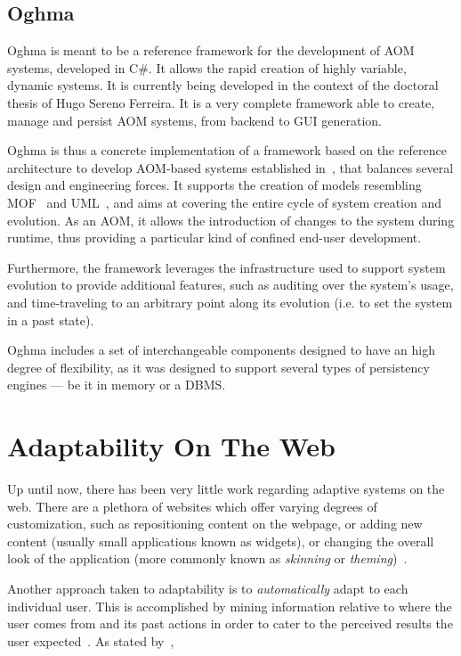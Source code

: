 \subsection{Oghma}\label{sec:oghma}

Oghma is meant to be a reference framework for the development of AOM systems, developed in C\#. It allows the rapid creation of highly variable, dynamic systems. It is currently being developed in the context of the doctoral thesis of Hugo Sereno Ferreira. It is a very complete framework able to create, manage and persist AOM systems, from backend to GUI generation.

Oghma is thus a concrete implementation of a framework based on the reference architecture to develop AOM-based systems established in~\cite{ferreira_phd_2010}, that balances several design and engineering forces. It supports the creation of models resembling MOF~\cite{mof} and UML~\cite{uml}, and aims at covering the entire cycle of system creation and evolution. As an AOM, it allows the introduction of changes to the system during runtime, thus providing a particular kind of confined end-user development.

Furthermore, the framework leverages the infrastructure used to support system evolution to provide additional features, such as auditing over the system’s usage, and time-traveling to an arbitrary point along its evolution (i.e. to set the system in a past state).

Oghma includes a set of interchangeable components designed to have an high degree of flexibility, as it was designed to support several types of persistency engines --- be it in memory or a DBMS.

\section{Adaptability On The Web}\label{sec:web_adaptability}

Up until now, there has been very little work regarding adaptive systems on the web. There are a plethora of websites which offer varying degrees of customization, such as repositioning content on the webpage, or adding new content (usually small applications known as widgets), or changing the overall look of the application (more commonly known as \emph{skinning} or \emph{theming})~\cite{igoogle, pageflakes, protopage, webwag}.

Another approach taken to adaptability is to \emph{automatically} adapt to each individual user. This is accomplished by mining information relative to where the user comes from and its past actions in order to cater to the perceived results the user expected~\cite{GGGR09}. As stated by~\cite{NC}, 

